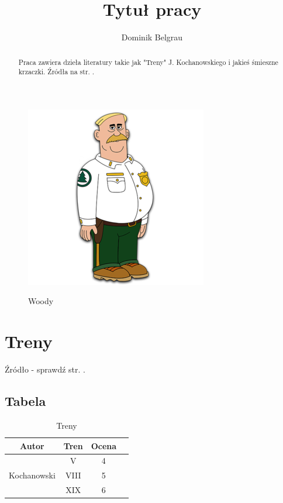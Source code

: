 \documentclass{article}
\title{Tytuł pracy}
\author{Dominik Belgrau}
\begin{document}
\maketitle

\begin{abstract}
    Praca zawiera dzieła literatury takie jak "Treny" J. Kochanowskiego i jakieś śmieszne krzaczki. Źródła na str. \pageref{bb}.
\end{abstract}
\begin{figure}[h!]
\includegraphics[scale=2]{woody.png} \label{o0}
\caption{Woody}
\end{figure}


\newpage

\tableofcontents
\listoftables
\listoffigures

\newpage

\section{Treny}

Źródło - sprawdź str. \pageref{bb}. \cite{Treny}

\subsection{Tabela} \label{tab}
\begin{table}
\begin{center}
\begin{tabular}{ |c|c|c|c| } 
\hline
Autor & Tren & Ocena \\
\hline
\multirow{3}{8em}{Kochanowski}  & V & 4 \\ 
& VIII & 5 \\ 
& XIX & 6 \\ 
\hline
\end{tabular}
\caption{Treny}
\end{center}
\end{table}
\end{document}
